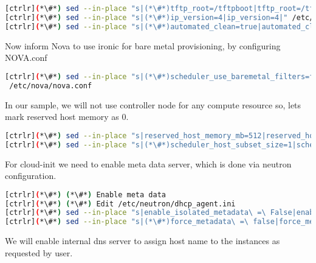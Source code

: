 
\begin{lstlisting}[language=bash,keywords={}]
[ctrlr](*\#*) sed --in-place "s|(*\#*)tftp_root=/tftpboot|tftp_root=/tftpboot|" /etc/ironic/ironic.conf
[ctrlr](*\#*) sed --in-place "s|(*\#*)ip_version=4|ip_version=4|" /etc/ironic/ironic.conf
[ctrlr](*\#*) sed --in-place "s|(*\#*)automated_clean=true|automated_clean=false|" /etc/ironic/ironic.conf
\end{lstlisting} 

Now inform Nova to use ironic for bare metal provisioning, by configuring NOVA.conf


\begin{lstlisting}[language=bash,keywords={}]
[ctrlr](*\#*) sed --in-place "s|(*\#*)scheduler_use_baremetal_filters=false|scheduler_use_baremetal_filters=true|" \
 /etc/nova/nova.conf
\end{lstlisting} 

In our sample, we will not use controller node for any compute resource so, lets mark reserved host memory as 0.


\begin{lstlisting}[language=bash,keywords={}]
[ctrlr](*\#*) sed --in-place "s|reserved_host_memory_mb=512|reserved_host_memory_mb=0|" /etc/nova/nova.conf
[ctrlr](*\#*) sed --in-place "s|(*\#*)scheduler_host_subset_size=1|scheduler_host_subset_size=9999999|" /etc/nova/nova.conf
\end{lstlisting} 

For cloud-init we need to enable meta data server, which is done via neutron configuration.


\begin{lstlisting}[language=bash,keywords={}]
[ctrlr](*\#*) (*\#*) Enable meta data
[ctrlr](*\#*) (*\#*) Edit /etc/neutron/dhcp_agent.ini
[ctrlr](*\#*) sed --in-place "s|enable_isolated_metadata\ =\ False|enable_isolated_metadata\ =\ True|" /etc/neutron/dhcp_agent.ini
[ctrlr](*\#*) sed --in-place "s|(*\#*)force_metadata\ =\ false|force_metadata\ =\ True|" \ /etc/neutron/dhcp_agent.ini
\end{lstlisting} 

We will enable internal dns server to assign host name to the instances as requested by user. 

